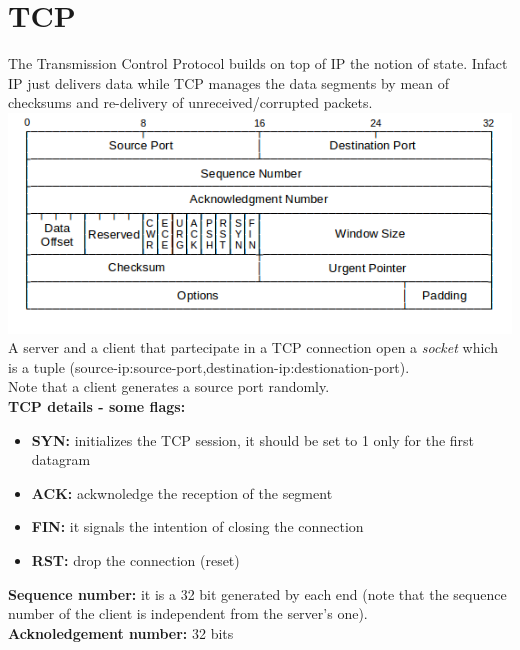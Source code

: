 \documentclass[10pt,a4paper]{book}
\begin{document}
\section{TCP}
The Transmission Control Protocol builds on top of IP the notion of state. Infact IP just delivers data while TCP manages the data segments by mean of checksums and re-delivery of unreceived/corrupted packets.\\
\includegraphics[scale=0.8]{img/tcp-header.png}\\
A server and a client that partecipate in a TCP connection open a \emph{socket} which is a tuple (source-ip:source-port,destination-ip:destionation-port).\\
Note that a client generates a source port randomly.\\
\textbf{TCP details - some flags:}
\begin{itemize}
\item \textbf{SYN:} initializes the TCP session, it should be set to 1 only for the first datagram
\item \textbf{ACK:} ackwnoledge the reception of the segment
\item \textbf{FIN:} it signals the intention of closing the connection
\item \textbf{RST:} drop the connection (reset)
\end{itemize}
\textbf{Sequence number:} it is a 32 bit generated by each end (note that the sequence number of the client is independent from the server's one).\\
\textbf{Acknoledgement number:} 32 bits\\\\
\newpage
\end{document}
